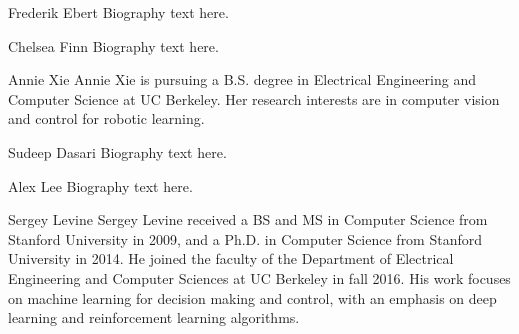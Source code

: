 \documentclass[10pt,journal,compsoc]{IEEEtran}
\begin{document}




% 

\begin{IEEEbiographynophoto}{Frederik Ebert}
Biography text here.
\end{IEEEbiographynophoto}

\begin{IEEEbiographynophoto}{Chelsea Finn}
Biography text here.
\end{IEEEbiographynophoto}


\begin{IEEEbiographynophoto}{Annie Xie}
Annie Xie is pursuing a B.S. degree in Electrical Engineering and Computer Science at UC Berkeley. Her research interests are in computer vision and control for robotic learning.
\end{IEEEbiographynophoto}

\begin{IEEEbiographynophoto}{Sudeep Dasari}
	Biography text here.
\end{IEEEbiographynophoto}

\begin{IEEEbiographynophoto}{Alex Lee}
	Biography text here.
\end{IEEEbiographynophoto}

\begin{IEEEbiographynophoto}{Sergey Levine}
Sergey Levine received a BS and MS in Computer Science from Stanford University in 2009, and a Ph.D. in Computer Science from Stanford University in 2014. He joined the faculty of the Department of Electrical Engineering and Computer Sciences at UC Berkeley in fall 2016. His work focuses on machine learning for decision making and control, with an emphasis on deep learning and reinforcement learning algorithms.
\end{IEEEbiographynophoto}
\end{document}
